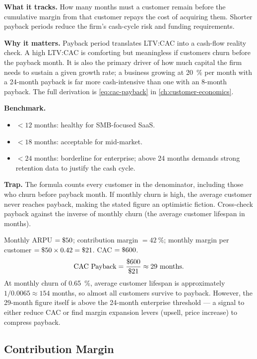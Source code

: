 \textbf{What it tracks.} How many months must a customer remain before the cumulative margin
from that customer repays the cost of acquiring them. Shorter payback periods reduce the
firm's cash-cycle risk and funding requirements.

\textbf{Why it matters.} Payback period translates LTV:CAC into a cash-flow reality check.
A high LTV:CAC is comforting but meaningless if customers churn before the payback month.
It is also the primary driver of how much capital the firm needs to sustain a given growth
rate; a business growing at \qty{20}{\percent} per month with a 24-month payback is far more
cash-intensive than one with an 8-month payback. The full derivation is \cref{eq:cac-payback}
in \cref{ch:customer-economics}.

\textbf{Benchmark.}
\begin{itemize}
  \item $< 12$ months: healthy for SMB-focused SaaS.
  \item $< 18$ months: acceptable for mid-market.
  \item $< 24$ months: borderline for enterprise; above 24 months demands strong retention
    data to justify the cash cycle.
\end{itemize}

\textbf{Trap.} The formula counts every customer in the denominator, including those who
churn before payback month. If monthly churn is high, the average customer never reaches
payback, making the stated figure an optimistic fiction. Cross-check payback against the
inverse of monthly churn (the average customer lifespan in months).

\begin{example}
Monthly ARPU $= \$\num{50}$; contribution margin $= \qty{42}{\percent}$; monthly margin per
customer $= \$\num{50} \times 0.42 = \$\num{21}$. CAC $= \$\num{600}$.
\[
  \text{CAC Payback} = \frac{\$\num{600}}{\$\num{21}} \approx 29 \text{ months}.
\]
At monthly churn of \qty{0.65}{\percent}, average customer lifespan is approximately
$1/0.0065 \approx 154$ months, so almost all customers survive to payback. However, the 29-month
figure itself is above the 24-month enterprise threshold --- a signal to either reduce CAC
or find margin expansion levers (upsell, price increase) to compress payback.
\end{example}


\subsection{Contribution Margin}

